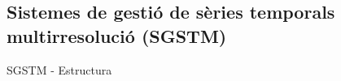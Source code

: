 \subsection[SGSTM]{Sistemes de gestió de sèries temporals multirresolució (SGSTM)}




\begin{frame}{SGSTM - Estructura}


\end{frame}




